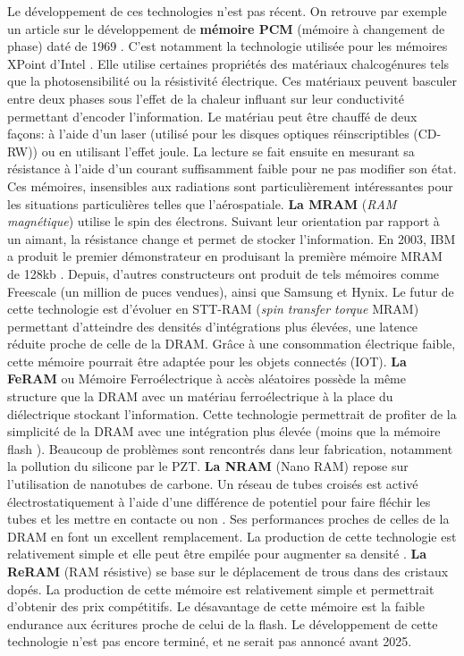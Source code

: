         Le développement de ces technologies n'est pas récent. On retrouve par exemple un article sur le développement de \textbf{mémoire PCM} (mémoire à changement de phase) daté de 1969 \cite{Sie1969}. C'est notamment la technologie utilisée pour les mémoires XPoint d'Intel \cite{Handy2015}. Elle utilise certaines propriétés des matériaux chalcogénures tels que la photosensibilité ou la résistivité électrique. Ces matériaux peuvent basculer entre deux phases sous l’effet de la chaleur influant sur leur conductivité permettant d'encoder l'information. Le matériau peut être chauffé de deux façons: à l'aide d'un laser (utilisé pour les disques optiques réinscriptibles (CD-RW)) ou en utilisant l'effet joule. La lecture se fait ensuite en mesurant sa résistance à l'aide d'un courant suffisamment faible pour ne pas modifier son état. Ces mémoires, insensibles aux radiations sont particulièrement intéressantes pour les situations particulières telles que l'aérospatiale. \textbf{La MRAM} (\textit{RAM magnétique}) utilise le spin des électrons.  Suivant leur orientation par rapport à un aimant, la résistance change et permet de stocker l'information. En 2003, IBM a produit le premier démonstrateur en produisant la première mémoire MRAM de 128kb  \cite{Bette2003}. Depuis, d'autres constructeurs ont produit de tels mémoires comme Freescale (un million de puces vendues), ainsi que Samsung et Hynix. Le futur de cette technologie est d'évoluer en STT-RAM \cite{Alvarez-Herault2010} (\textit{spin transfer torque} MRAM) permettant d'atteindre des densités d'intégrations plus élevées, une latence réduite proche de celle de la DRAM. Grâce à une consommation électrique faible, cette mémoire pourrait être adaptée pour les objets connectés (IOT). \textbf{La FeRAM} ou Mémoire Ferroélectrique à accès aléatoires possède la même structure que la DRAM avec un matériau ferroélectrique à la place du diélectrique stockant l’information. Cette technologie permettrait de profiter de la simplicité de la DRAM avec une intégration plus élevée (moins que la mémoire flash \cite{Alvarez-Herault2010}). Beaucoup de problèmes sont rencontrés dans leur fabrication, notamment la pollution du silicone par le PZT. \textbf{La NRAM} (Nano RAM) repose sur l'utilisation de nanotubes de carbone. Un réseau de tubes croisés est activé électrostatiquement à l'aide d'une différence de potentiel pour faire fléchir les tubes et les mettre en contacte ou non \cite{Ricart2008}. Ses performances proches de celles de la DRAM en font un excellent remplacement.  La production de cette technologie est relativement simple et elle peut être empilée pour augmenter sa densité \cite{Gervasi2019}. \textbf{La ReRAM} (RAM résistive) se base sur le déplacement de trous dans des cristaux dopés. La production de cette mémoire est relativement simple et permettrait d'obtenir des prix compétitifs. Le désavantage de cette mémoire est la faible endurance aux écritures proche de celui de la flash. Le développement de cette technologie n'est pas encore terminé, et ne serait pas annoncé avant 2025.
        
